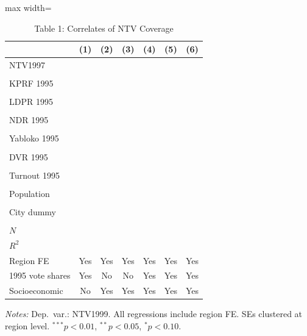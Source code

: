 \begin{table}[htbp]
\centering
\caption{Table 1: Correlates of NTV Coverage}
\label{tab:enik_table1}
\begin{adjustbox}{max width=\textwidth}
\begin{tabular}{lcccccc}
\toprule
 & (1) & (2) & (3) & (4) & (5) & (6) \\
\midrule
NTV1997 &  &  &  &  &  &  \\
 &  &  &  &  &  &  \\
KPRF 1995 &  &  &  &  &  &  \\
 &  &  &  &  &  &  \\
LDPR 1995 &  &  &  &  &  &  \\
 &  &  &  &  &  &  \\
NDR 1995 &  &  &  &  &  &  \\
 &  &  &  &  &  &  \\
Yabloko 1995 &  &  &  &  &  &  \\
 &  &  &  &  &  &  \\
DVR 1995 &  &  &  &  &  &  \\
 &  &  &  &  &  &  \\
Turnout 1995 &  &  &  &  &  &  \\
 &  &  &  &  &  &  \\
Population &  &  &  &  &  &  \\
 &  &  &  &  &  &  \\
City dummy &  &  &  &  &  &  \\
 &  &  &  &  &  &  \\
\midrule
$N$ &  &  &  &  &  &  \\
$R^2$ &  &  &  &  &  &  \\
\midrule
Region FE & Yes & Yes & Yes & Yes & Yes & Yes \\
1995 vote shares & Yes & No & No & Yes & Yes & Yes \\
Socioeconomic & No & Yes & Yes & Yes & Yes & Yes \\
\bottomrule
\end{tabular}
\end{adjustbox}
\parbox{\textwidth}{\footnotesize\textit{Notes:} Dep.\ var.: NTV1999. All regressions include region FE. SEs clustered at region level. $^{***}p<0.01$, $^{**}p<0.05$, $^{*}p<0.10$.}
\end{table}